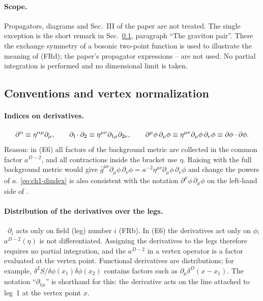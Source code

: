\paragraph{Scope.} Propagators, diagrams and Sec.~III of the paper are not
treated. The single exception is the short remark in
Sec.~\ref{sec:ch1-t2-norm}, paragraph ``The graviton pair''. There the exchange
symmetry of a bosonic two-point function is used to illustrate the meaning of
(FRd); the paper's propagator expressions -- are not used. No
partial integration is performed and no dimensional limit is taken.

\subsection{Conventions and vertex normalization}
\label{sec:ch1-t2-norm}

\paragraph{Indices on derivatives.} \tA
\begin{equation}
\partial^\alpha\equiv\eta^{\alpha\mu}\partial_\mu,\qquad \partial_1\!\cdot\partial_2\equiv\eta^{\mu\nu}\partial_{1\mu}\partial_{2\nu},\qquad \partial^\mu\phi\,\partial_\mu\phi\equiv\eta^{\mu\nu}\partial_\mu\phi\,\partial_\nu\phi\equiv\partial\phi\cdot\partial\phi .
\label{eq:ch1-dindex}
\end{equation}
Reason: in (E6) all factors of the background metric are collected in the
common factor $a^{D-2}$, and all contractions inside the bracket use $\eta$.
Raising with the full background metric would give
$\hat g^{\mu\nu}\partial_\mu\phi\,\partial_\nu\phi=a^{-2}\eta^{\mu\nu}\partial_\mu\phi\,\partial_\nu\phi$
and change the powers of $a$. \eqref{eq:ch1-dindex} is also consistent with the
notation $\partial^\mu\phi\,\partial_\mu\phi$ on the left-hand side of .

\paragraph{Distribution of the derivatives over the legs.} \tP\ $\partial_i$
acts only on field (leg) number $i$ (FRb). In (E6) the derivatives act only on
$\phi$; $a^{D-2}(\eta)$ is not differentiated. Assigning the derivatives to the
legs therefore requires no partial integration, and the $a^{D-2}$ in a vertex
operator is a factor evaluated at the vertex point. Functional derivatives are
distributions; for example,
$\delta^2S/\delta\phi(x_1)\delta\phi(x_2)$ contains factors such as
$\partial_\mu\delta^D(x-x_1)$. The notation ``$\partial_{1\mu}$'' is shorthand
for this: the derivative acts on the line attached to leg~1 at the vertex
point $x$.

